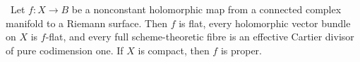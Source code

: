 
\begin{lemma}
\hypertarget{tag-03I8}{}\label{wbII:lem:curve-flatness}


\ Let $f:X\to B$ be a nonconstant holomorphic map from a connected
complex manifold to a Riemann surface.  Then $f$ is flat, every holomorphic
vector bundle on $X$ is $f$-flat, and every full scheme-theoretic fibre is an
effective Cartier divisor of pure codimension one.  If $X$ is compact, then
$f$ is proper.
\end{lemma}

